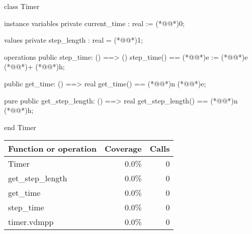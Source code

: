 \documentclass[a4paper]{article}
\begin{document}
\title{}
\author{}
\begin{vdm_al}
class Timer 

instance variables
    private current_time : real := (*@\vdmnotcovered{}@*)0;

values 
    private step_length : real = (*@@*)1;

operations
    public step_time: () ==> ()
    step_time() == (*@@*)e := (*@@*)e (*@\vdmnotcovered{}@*)+ (*@@*)h;

    public get_time: () ==> real 
    get_time() == (*@@*)n (*@@*)e;

    pure public get_step_length: () ==> real
    get_step_length() == (*@@*)n (*@@*)h;

end Timer
\end{vdm_al}
\bigskip
\begin{longtable}{|l|r|r|}
\hline
Function or operation & Coverage & Calls \\
\hline
\hline
Timer & 0.0\% & 0 \\
\hline
get\_step\_length & 0.0\% & 0 \\
\hline
get\_time & 0.0\% & 0 \\
\hline
step\_time & 0.0\% & 0 \\
\hline
\hline
timer.vdmpp & 0.0\% & 0 \\
\hline
\end{longtable}
\end{document}
